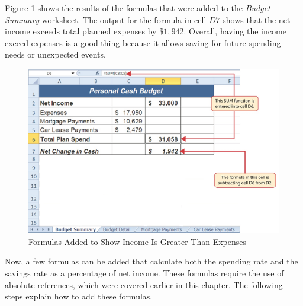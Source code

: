 Figure \ref{02:fig38} shows the results of the formulas that were added to the \textit{Budget Summary} worksheet. The output for the formula in cell $ D7 $ shows that the net income exceeds total planned expenses by $ \$1,942 $. Overall, having the income exceed expenses is a good thing because it allows saving for future spending needs or unexpected events.

\begin{figure}[H]
	\centering
	\includegraphics[width=\maxwidth{.95\linewidth}]{gfx/ch02_fig38}
	\caption{Formulas Added to Show Income Is Greater Than Expenses}
	\label{02:fig38}
\end{figure}

Now, a few formulas can be added that calculate both the spending rate and the savings rate as a percentage of net income. These formulas require the use of absolute references, which were covered earlier in this chapter. The following steps explain how to add these formulas.

